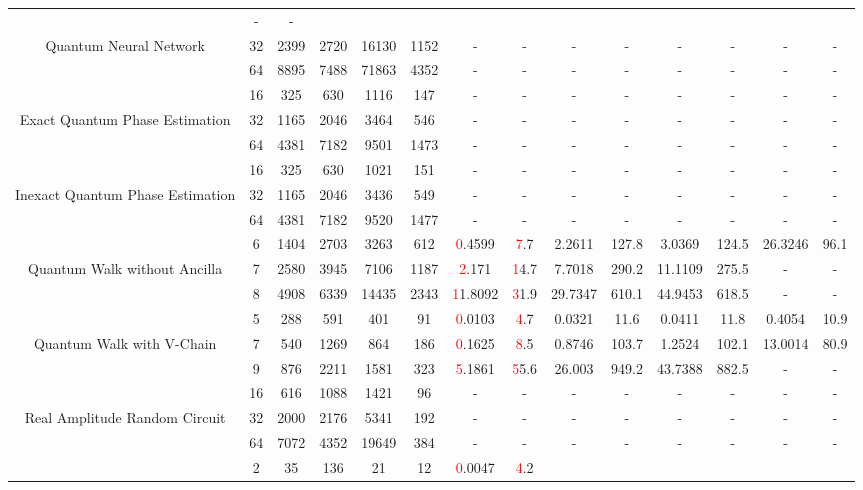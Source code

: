 \begin{table}[htb]
{\begin{tabular}{|c|c|c|c|c|c|c|c|c|c|c|c|c|c|}
 & - & -
 \\
Quantum Neural Network & 
32 & 2399 & 2720 & 16130 & 1152
 & - & -
 & - & -
 & - & -
 & - & -
 \\
 & 
64 & 8895 & 7488 & 71863 & 4352
 & - & -
 & - & -
 & - & -
 & - & -
 \\
\hline
 & 
16 & 325 & 630 & 1116 & 147
 & - & -
 & - & -
 & - & -
 & - & -
 \\
Exact Quantum Phase Estimation & 
32 & 1165 & 2046 & 3464 & 546
 & - & -
 & - & -
 & - & -
 & - & -
 \\
 & 
64 & 4381 & 7182 & 9501 & 1473
 & - & -
 & - & -
 & - & -
 & - & -
 \\
\hline
 & 
16 & 325 & 630 & 1021 & 151
 & - & -
 & - & -
 & - & -
 & - & -
 \\
Inexact Quantum Phase Estimation & 
32 & 1165 & 2046 & 3436 & 549
 & - & -
 & - & -
 & - & -
 & - & -
 \\
 & 
64 & 4381 & 7182 & 9520 & 1477
 & - & -
 & - & -
 & - & -
 & - & -
 \\
\hline
 & 
6 & 1404 & 2703 & 3263 & 612
 & \textcolor{red}0.4599 & \textcolor{red}7.7
 & 2.2611 & 127.8
 & 3.0369 & 124.5
 & 26.3246 & 96.1
 \\
Quantum Walk without Ancilla & 
7 & 2580 & 3945 & 7106 & 1187
 & \textcolor{red}2.171 & \textcolor{red}14.7
 & 7.7018 & 290.2
 & 11.1109 & 275.5
 & - & -
 \\
 & 
8 & 4908 & 6339 & 14435 & 2343
 & \textcolor{red}11.8092 & \textcolor{red}31.9
 & 29.7347 & 610.1
 & 44.9453 & 618.5
 & - & -
 \\
\hline
 & 
5 & 288 & 591 & 401 & 91
 & \textcolor{red}0.0103 & \textcolor{red}4.7
 & 0.0321 & 11.6
 & 0.0411 & 11.8
 & 0.4054 & 10.9
 \\
Quantum Walk with V-Chain & 
7 & 540 & 1269 & 864 & 186
 & \textcolor{red}0.1625 & \textcolor{red}8.5
 & 0.8746 & 103.7
 & 1.2524 & 102.1
 & 13.0014 & 80.9
 \\
 & 
9 & 876 & 2211 & 1581 & 323
 & \textcolor{red}5.1861 & \textcolor{red}55.6
 & 26.003 & 949.2
 & 43.7388 & 882.5
 & - & -
 \\
\hline
 & 
16 & 616 & 1088 & 1421 & 96
 & - & -
 & - & -
 & - & -
 & - & -
 \\
Real Amplitude Random Circuit & 
32 & 2000 & 2176 & 5341 & 192
 & - & -
 & - & -
 & - & -
 & - & -
 \\
 & 
64 & 7072 & 4352 & 19649 & 384
 & - & -
 & - & -
 & - & -
 & - & -
 \\
\hline
 & 
2 & 35 & 136 & 21 & 12
 & \textcolor{red}0.0047 & \textcolor{red}4.2

\end{tabular}}
\end{table}
